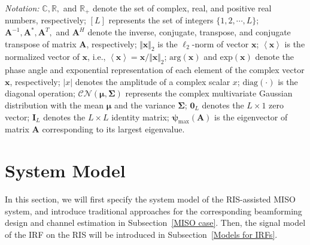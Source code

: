 \documentclass[12pt,draftclsnofoot,journal,onecolumn]{IEEEtran}
\theoremstyle{nonumberplain}
\begin{document}
\textit{Notation:} $\mathbb C, \mathbb R,$ and $\mathbb R_+$ denote the set of
complex, real, and positive real numbers, respectively;
$[L]$ represents the set of integers $\{1,2,\cdots,L\}$;
$\bm A^{-1}, \bm A^*,\bm A^T,$ and $\bm A^H$ denote the inverse, conjugate, transpose, and conjugate transpose of matrix $\bm A$, respectively; 
$\Vert\bm x\Vert_{2}$ is the $\ell_{2}$-norm of vector $\bm x$; 
$\left\langle\bm x\right\rangle$ is the normalized vector of $\bm x$, i.e., $\left\langle\bm x\right\rangle=\bm x/\Vert\bm x\Vert_{2}$;
$\text{arg}(\bm x)$ and $\text{exp}(\bm x)$ denote the phase angle and exponential representation of each element of the complex vector $\bm x$, respectively;
$\vert x\vert$ denotes the amplitude
of a complex scalar $x$; 
$\text{diag}(\cdot )$ is the diagonal operation;
$\mathcal{CN}\left(\bm \mu, \bm \Sigma \right)$ represents the complex multivariate Gaussian distribution with the mean $\bm \mu$ and the variance $\bm \Sigma$;
$\bm 0_{L}$ denotes the $L\times 1$ zero vector;
$\bm I_{L}$ denotes the $L\times L$ identity matrix;
$\bm \psi_{\text{max}}(\bm A)$ is the eigenvector of matrix
$\bm A$ corresponding to its largest eigenvalue.


\section{System Model}  \label{System Model}
    In this section, we will first specify the system model of the RIS-assisted \ac{MISO} system, and introduce traditional approaches for the corresponding beamforming design and channel estimation in Subsection~\ref{MISO case}. Then, the signal model of the \ac{IRF} on the RIS will be introduced in Subsection~\ref{Models for IRFs}.
\end{document}
